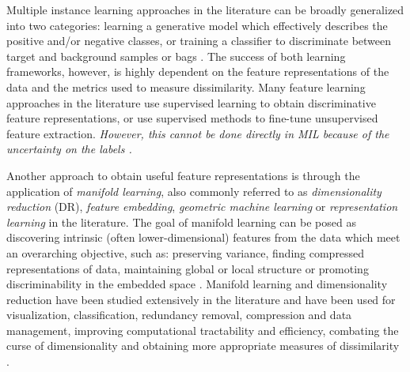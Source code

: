 Multiple instance learning approaches in the literature can be broadly generalized into two categories: learning a generative model which effectively describes the positive and/or negative classes, or training a classifier to discriminate between target and background samples or bags \citep{Ghaffarzadegan2018MILVAE}.  The success of both learning frameworks, however, is highly dependent on the feature representations of the data and the metrics used to measure dissimilarity.  Many feature learning approaches in the literature use supervised learning to obtain discriminative feature representations, or use supervised methods to fine-tune unsupervised  feature extraction.  \textit{However, this cannot be done directly in MIL because of the uncertainty on the labels \citep{Carbonneau2016MILSurvey}.}

Another approach to obtain useful feature representations is through the application of  \textit{manifold learning}, also commonly referred to as \textit{dimensionality reduction} (DR), \textit{feature embedding}, \textit{geometric machine learning} or \textit{representation learning} in the literature.  The goal of manifold learning can be posed as discovering intrinsic (often lower-dimensional) features from the data which meet an overarching objective, such as: preserving variance, finding compressed representations of data, maintaining global or local structure or promoting discriminability in the embedded space \citep{VanDerMaaten2009DRReview,Bengio2014RepLearningReview, Geng2005SupNonlinearDimRed, Thorstensen2009ManifoldThesis}.  Manifold learning and dimensionality reduction have been studied extensively in the literature and have been used for visualization, classification, redundancy removal, compression and data management, improving computational tractability and efficiency, combating the curse of dimensionality and obtaining more appropriate measures of dissimilarity \citep{Bishop1998GTM,Nickel2017PoincareEmbeddings,Talmon2015ManifoldLearningInDynamicalSystems,Tenenbaum2000Isomap, Geng2005SupNonlinearDimRed, Palomo2017GHNG, Kohonen1990SOM,Kegl2008PrincipalManifoldsTextbook,Bengio2014RepLearningReview}.


